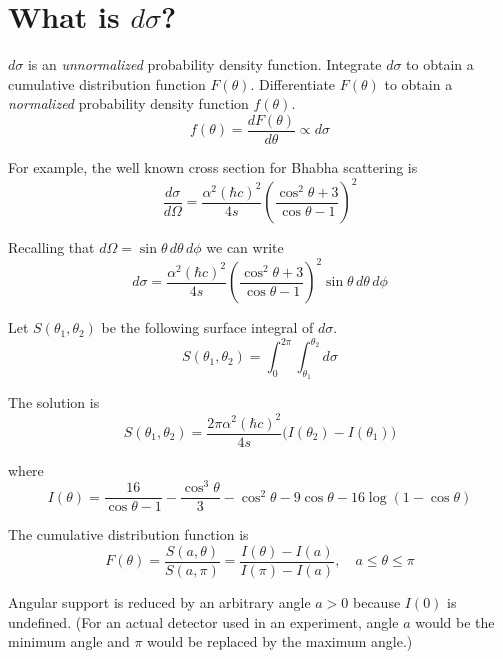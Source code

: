 

\section*{What is $d\sigma$?}

$d\sigma$ is an \textit{unnormalized} probability density function.
Integrate $d\sigma$ to obtain a
cumulative distribution function $F(\theta)$.
Differentiate $F(\theta)$ to obtain a
\textit{normalized} probability density function $f(\theta)$.
\begin{equation*}
f(\theta)=\frac{dF(\theta)}{d\theta}
\propto d\sigma
\end{equation*}

For example, the well known cross section for Bhabha scattering is
\begin{equation*}
\frac{d\sigma}{d\Omega}
=\frac{\alpha^2(\hbar c)^2}{4s}
\left(\frac{\cos^2\theta+3}{\cos\theta-1}\right)^2
\end{equation*}

Recalling that $d\Omega=\sin\theta\,d\theta\,d\phi$ we can write
\begin{equation*}
d\sigma
=\frac{\alpha^2(\hbar c)^2}{4s}
\left(\frac{\cos^2\theta+3}{\cos\theta-1}\right)^2
\sin\theta\,d\theta\,d\phi
\end{equation*}

Let $S(\theta_1,\theta_2)$ be the following surface integral of $d\sigma$.
\begin{equation*}
S(\theta_1,\theta_2)=\int_0^{2\pi}\int_{\theta_1}^{\theta_2}d\sigma
\end{equation*}

The solution is
\begin{equation*}
S(\theta_1,\theta_2)=\frac{2\pi\alpha^2(\hbar c)^2}{4s}\bigl(I(\theta_2)-I(\theta_1)\bigr)
\end{equation*}

where
\begin{equation*}
I(\theta)=
\frac{16}{\cos\theta-1}-\frac{\cos^3\theta}{3}-\cos^2\theta-9\cos\theta-16\log(1-\cos\theta)
\end{equation*}

The cumulative distribution function is
\begin{equation*}
F(\theta)
=\frac{S(a,\theta)}{S(a,\pi)}
=\frac{I(\theta)-I(a)}{I(\pi)-I(a)},
\quad
a\le\theta\le\pi
\end{equation*}

Angular support is reduced by an arbitrary angle $a>0$ because $I(0)$ is undefined.
(For an actual detector used in an experiment,
angle $a$ would be the minimum
angle and $\pi$ would be replaced by the maximum angle.)

